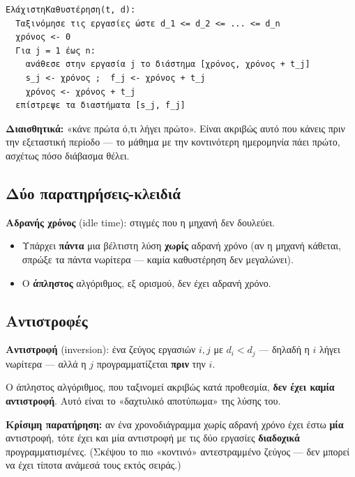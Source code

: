 \documentclass[11pt,a4paper]{article}
\begin{document}
\begin{codebox}
\begin{verbatim}
ΕλάχιστηΚαθυστέρηση(t, d):
  Ταξινόμησε τις εργασίες ώστε d_1 <= d_2 <= ... <= d_n
  χρόνος <- 0
  Για j = 1 έως n:
    ανάθεσε στην εργασία j το διάστημα [χρόνος, χρόνος + t_j]
    s_j <- χρόνος ;  f_j <- χρόνος + t_j
    χρόνος <- χρόνος + t_j
  επίστρεψε τα διαστήματα [s_j, f_j]
\end{verbatim}
\end{codebox}

\begin{intuition}
\textbf{Διαισθητικά:} «κάνε πρώτα ό,τι λήγει πρώτο». Είναι ακριβώς αυτό που
κάνεις πριν την εξεταστική περίοδο --- το μάθημα με την κοντινότερη ημερομηνία
πάει πρώτο, ασχέτως πόσο διάβασμα θέλει.
\end{intuition}

\subsection{Δύο παρατηρήσεις-κλειδιά}

\begin{keypoint}
\textbf{Αδρανής χρόνος} (idle time): στιγμές που η μηχανή δεν δουλεύει.
\begin{itemize}
  \item Υπάρχει \textbf{πάντα} μια βέλτιστη λύση \textbf{χωρίς} αδρανή χρόνο (αν
  η μηχανή κάθεται, σπρώξε τα πάντα νωρίτερα --- καμία καθυστέρηση δεν
  μεγαλώνει).
  \item Ο \textbf{άπληστος} αλγόριθμος, εξ ορισμού, δεν έχει αδρανή χρόνο.
\end{itemize}
\end{keypoint}

\subsection{Αντιστροφές}

\begin{keypoint}
\textbf{Αντιστροφή} (inversion): ένα ζεύγος εργασιών $i, j$ με $d_i < d_j$ ---
δηλαδή η $i$ λήγει νωρίτερα --- αλλά η $j$ προγραμματίζεται \textbf{πριν} την $i$.
\end{keypoint}

Ο άπληστος αλγόριθμος, που ταξινομεί ακριβώς κατά προθεσμία, \textbf{δεν έχει
καμία αντιστροφή}. Αυτό είναι το «δαχτυλικό αποτύπωμα» της λύσης του.

\begin{intuition}
\textbf{Κρίσιμη παρατήρηση:} αν ένα χρονοδιάγραμμα χωρίς αδρανή χρόνο έχει έστω
\textbf{μία} αντιστροφή, τότε έχει και μία αντιστροφή με τις δύο εργασίες
\textbf{διαδοχικά} προγραμματισμένες. (Σκέψου το πιο «κοντινό» αντεστραμμένο
ζεύγος --- δεν μπορεί να έχει τίποτα ανάμεσά τους εκτός σειράς.)
\end{intuition}
\end{document}
